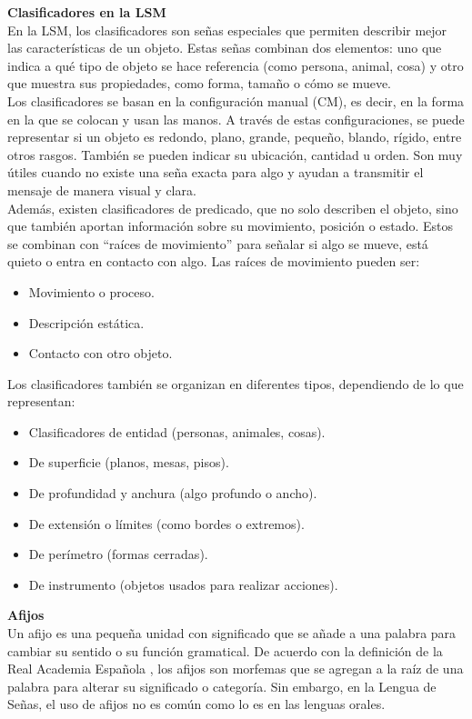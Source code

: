 \textbf{Clasificadores en la LSM}\\
En la LSM, los clasificadores son señas especiales que permiten describir mejor las características de un objeto. Estas señas combinan dos elementos: uno que indica a qué tipo de objeto se hace referencia (como persona, animal, cosa) y otro que muestra sus propiedades, como forma, tamaño o cómo se mueve.\\

Los clasificadores se basan en la configuración manual (CM), es decir, en la forma en la que se colocan y usan las manos. A través de estas configuraciones, se puede representar si un objeto es redondo, plano, grande, pequeño, blando, rígido, entre otros rasgos. También se pueden indicar su ubicación, cantidad u orden. Son muy útiles cuando no existe una seña exacta para algo y ayudan a transmitir el mensaje de manera visual y clara.\\

Además, existen clasificadores de predicado, que no solo describen el objeto, sino que también aportan información sobre su movimiento, posición o estado. Estos se combinan con “raíces de movimiento” para señalar si algo se mueve, está quieto o entra en contacto con algo. Las raíces de movimiento pueden ser:
\begin{itemize}
    \item Movimiento o proceso.
    \item Descripción estática.
    \item Contacto con otro objeto.
\end{itemize}

Los clasificadores también se organizan en diferentes tipos, dependiendo de lo que representan:
\begin{itemize}
    \item Clasificadores de entidad (personas, animales, cosas).
    \item De superficie (planos, mesas, pisos).
    \item De profundidad y anchura (algo profundo o ancho).
    \item De extensión o límites (como bordes o extremos).
    \item De perímetro (formas cerradas).
    \item De instrumento (objetos usados para realizar acciones).
\end{itemize}

\textbf{Afijos}\\
Un afijo es una pequeña unidad con significado que se añade a una palabra para cambiar su sentido o su función gramatical. De acuerdo con la definición de la Real Academia Española \cite{refrae}, los afijos son morfemas que se agregan a la raíz de una palabra para alterar su significado o categoría. Sin embargo, en la Lengua de Señas, el uso de afijos no es común como lo es en las lenguas orales.\\

